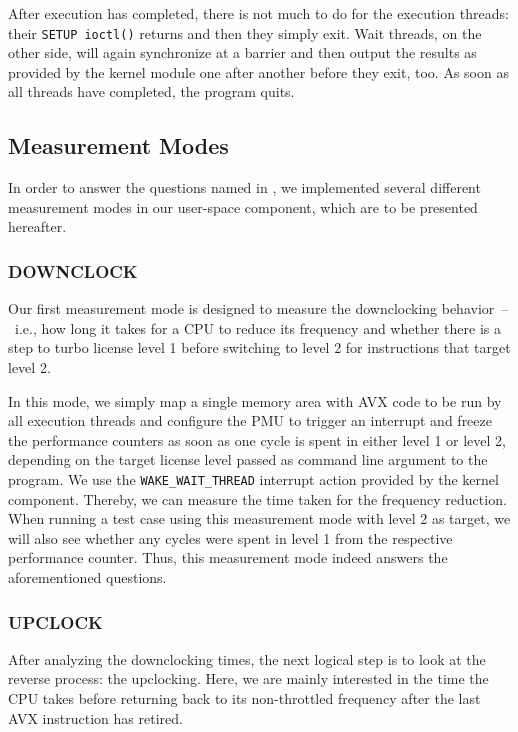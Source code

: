 After execution has completed, there is not much to do for the execution threads: their \texttt{SETUP ioctl()} returns and then they simply exit. Wait threads, on the other side, will again synchronize at a barrier and then output the results as provided by the kernel module one after another before they exit, too. As soon as all threads have completed, the program quits.

\subsection{Measurement Modes}
\label{sec:analysis:design:measurementmodes}

In order to answer the questions named in , we implemented several different measurement modes in our user-space component, which are to be presented hereafter.

\subsubsection{DOWNCLOCK}
\label{sec:analysis:design:measurementmodes:downclock}

Our first measurement mode is designed to measure the downclocking behavior~--~i.e., how long it takes for a \gls{CPU} to reduce its frequency and whether there is a step to turbo license level 1 before switching to level 2 for instructions that target level 2.

In this mode, we simply map a single memory area with \gls{AVX} code to be run by all execution threads and configure the \gls{PMU} to trigger an interrupt and freeze the performance counters as soon as one cycle is spent in either level 1 or level 2, depending on the target license level passed as command line argument to the program. We use the \texttt{WAKE\_WAIT\_THREAD} interrupt action provided by the kernel component. Thereby, we can measure the time taken for the frequency reduction. When running a test case using this measurement mode with level 2 as target, we will also see whether any cycles were spent in level 1 from the respective performance counter. Thus, this measurement mode indeed answers the aforementioned questions.

\subsubsection{UPCLOCK}
\label{sec:analysis:design:measurementmodes:upclock}

After analyzing the downclocking times, the next logical step is to look at the reverse process: the upclocking. Here, we are mainly interested in the time the \gls{CPU} takes before returning back to its non-throttled frequency after the last \gls{AVX} instruction has retired.

